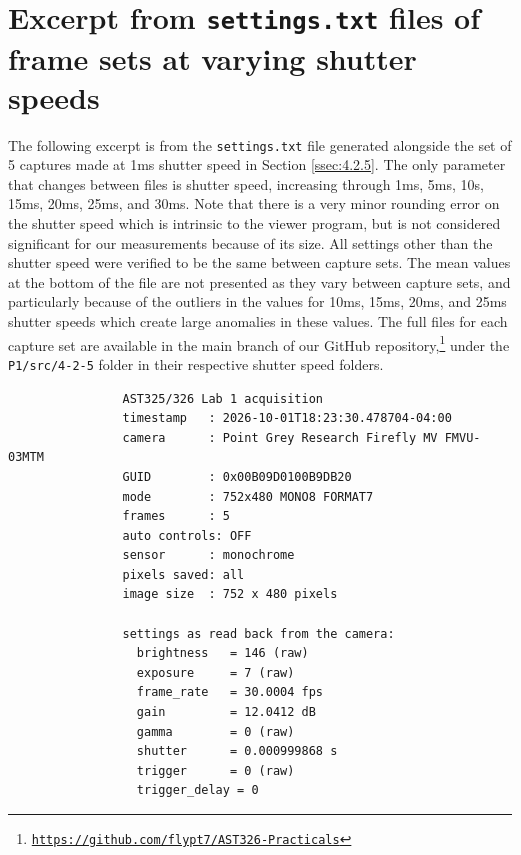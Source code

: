 \documentclass[preprint2]{aastex702}
\begin{document}
		\section{Excerpt from \texttt{settings.txt} files of frame sets at varying shutter speeds}\label{4.2.5-settings}

			The following excerpt is from the \texttt{settings.txt} file generated alongside the set of 5 captures made at 1ms shutter speed in Section \ref{ssec:4.2.5}. The only parameter that changes between files	is shutter speed, increasing through 1ms, 5ms, 10s, 15ms, 20ms, 25ms, and 30ms. Note that there is a very minor rounding error on the shutter speed which is intrinsic to the viewer program, but is not considered significant for our measurements because of its size. All settings other than the shutter speed were verified to be the same between capture sets. The mean values at the bottom of the file are not presented as they vary between capture sets, and particularly because of the outliers in the values for 10ms, 15ms, 20ms, and 25ms shutter speeds which create large anomalies in these values. The full files for each capture set are available in the main branch of our GitHub repository,\footnote{\texttt{\href{https://github.com/flypt7/AST326-Practicals}{https://github.com/flypt7/AST326-Practicals}}} under the \texttt{P1/src/4-2-5} folder in their respective shutter speed folders.

			\begin{verbatim}
				AST325/326 Lab 1 acquisition
				timestamp   : 2026-10-01T18:23:30.478704-04:00
				camera      : Point Grey Research Firefly MV FMVU-03MTM
				GUID        : 0x00B09D0100B9DB20
				mode        : 752x480 MONO8 FORMAT7
				frames      : 5
				auto controls: OFF
				sensor      : monochrome
				pixels saved: all
				image size  : 752 x 480 pixels
				
				settings as read back from the camera:
				  brightness   = 146 (raw)
				  exposure     = 7 (raw)
				  frame_rate   = 30.0004 fps
				  gain         = 12.0412 dB
				  gamma        = 0 (raw)
				  shutter      = 0.000999868 s
				  trigger      = 0 (raw)
				  trigger_delay = 0 
			\end{verbatim}
\end{document}
